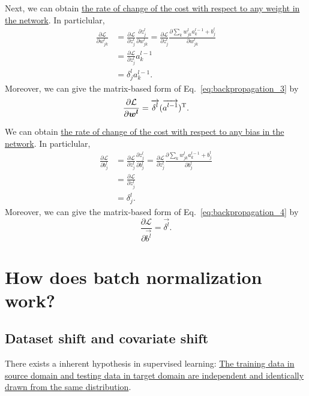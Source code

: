 \documentclass[10pt,onecolumn]{book}
\newcommand{\bm}[1]{\mbox{\boldmath{$#1$}}}
\begin{document}
Next, we can obtain \uline{the rate of change of the cost with respect to any weight in the network}. In particlular, 
\begin{equation}\label{eq:backpropagation_3}
\begin{split}
\frac{\partial \mathcal{L}}{\partial w^l_{jk}} & = \frac{\partial \mathcal{L}}{\partial z^l_j} \frac{\partial z^l_j}{\partial w^l_{jk}}
	= \frac{\partial \mathcal{L}}{\partial z^l_j} \frac{\partial \sum_k w^l_{jk} a^{l-1}_k + b^l_j}{\partial w^l_{jk}} \\
	& = \frac{\partial \mathcal{L}}{\partial z^l_j} a^{l - 1}_k \\
	& = \delta^l_j a^{l - 1}_k.
\end{split}
\tag{BP3}
\end{equation}
Moreover, we can give the matrix-based form of Eq.~\ref{eq:backpropagation_3} by
\begin{equation}
\frac{\partial \mathcal{L}}{\partial \bm{w^l}} = \overrightarrow{\delta^l} (\overrightarrow{a^{l-1}})^\mathrm{T}.
\end{equation}

We can obtain \uline{the rate of change of the cost with respect to any bias in the network}. In particlular, 
\begin{equation}\label{eq:backpropagation_4}
\begin{split}
\frac{\partial \mathcal{L}}{\partial b^l_j} & = \frac{\partial \mathcal{L}}{\partial z^l_j} \frac{\partial z^l_j}{\partial b^l_j}
	= \frac{\partial \mathcal{L}}{\partial z^l_j} \frac{\partial \sum_k w^l_{jk} a^{l-1}_k + b^l_j}{\partial b^l_j} \\
	& = \frac{\partial \mathcal{L}}{\partial z^l_j} \\
	& = \delta^l_j.
\end{split}
\tag{BP4}
\end{equation}
Moreover, we can give the matrix-based form of Eq.~\ref{eq:backpropagation_4} by
\begin{equation}
\frac{\partial \mathcal{L}}{\partial \overrightarrow{b^l}} = \overrightarrow{\delta^l}.
\end{equation}

\section{How does batch normalization work?}
\subsection{Dataset shift and covariate shift}
There exists a inherent hypothesis in supervised learning: \uline{The training data in source domain and testing data in target domain are independent and identically drawn from the same distribution}. 
\end{document}
